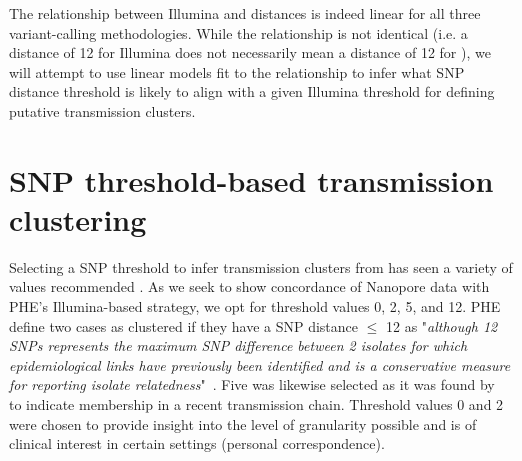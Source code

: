 The relationship between Illumina and \ont{} distances is indeed linear for all three variant-calling methodologies. While the relationship is not identical (i.e. a distance of 12 for Illumina does not necessarily mean a distance of 12 for \ont{}), we will attempt to use linear models fit to the relationship to infer what \ont{} SNP distance threshold is likely to align with a given Illumina threshold for defining putative transmission clusters.


\section{SNP threshold-based \ont{} transmission clustering}

Selecting a SNP threshold to infer transmission clusters from has seen a
variety of values recommended \cite{stimson2019}. As we seek to show
concordance of Nanopore data with PHE's Illumina-based strategy, we opt
for threshold values 0, 2, 5, and 12. PHE define two cases as clustered
if they have a SNP distance $\le$ 12 as "\emph{although 12
SNPs represents the maximum SNP difference between 2 isolates for which
epidemiological links have previously been identified
 and is a conservative measure for reporting
isolate relatedness}"~. Five was likewise selected as
it was found by~ to indicate membership in a recent
transmission chain. Threshold values 0 and 2 were chosen to provide
insight into the level of granularity possible and is of clinical
interest in certain settings (personal correspondence).



